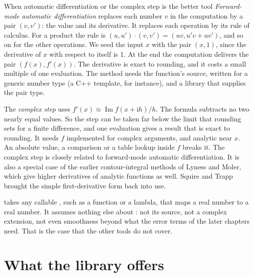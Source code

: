 \begin{sidebar}[label=sb:alternatives]{When automatic differentiation or the complex step is the better tool}
\emph{Forward-mode automatic differentiation} replaces each number $v$ in the computation by a pair $(v, v')$: the
value and its derivative. It replaces each operation by its rule of calculus. For a product the rule is
$(u, u') \cdot (v, v') = (uv, u'v + uv')$, and so on for the other operations. We seed the input $x$ with the pair
$(x, 1)$, since the derivative of $x$ with respect to itself is 1. At the end the computation delivers the pair
$(f(x), f'(x))$. The derivative is exact to rounding, and it costs a small multiple of one evaluation. The method
needs the function's source, written for a generic number type (a C++ template, for instance), and a library that
supplies the pair type.\cite{griewank2008}

The \emph{complex step} uses $f'(x) \approx \operatorname{Im} f(x + \mathrm{i} h) / h$.\cite{squire1998} The formula
subtracts no two nearly equal values. So the step can be taken far below the limit that rounding sets for a finite
difference, and one evaluation gives a result that is exact to rounding. It needs $f$ implemented for complex
arguments, and analytic near $x$. An absolute value, a comparison or a table lookup inside $f$ breaks it. The complex
step is closely related to forward-mode automatic differentiation.\cite{martins2003} It is also a special case of the
earlier contour-integral methods of Lyness and Moler, which give higher derivatives of analytic functions as
well.\cite{lyness1967} Squire and Trapp brought the simple first-derivative form back into use.

 takes any callable , such as a function or a lambda, that maps a real number to a real
number. It assumes nothing else about : not its source, not a complex extension, not even smoothness beyond
what the error terms of the later chapters need. That is the case that the other tools do not cover.
\end{sidebar}

\section{What the library offers}\label{sec:why-offers}

